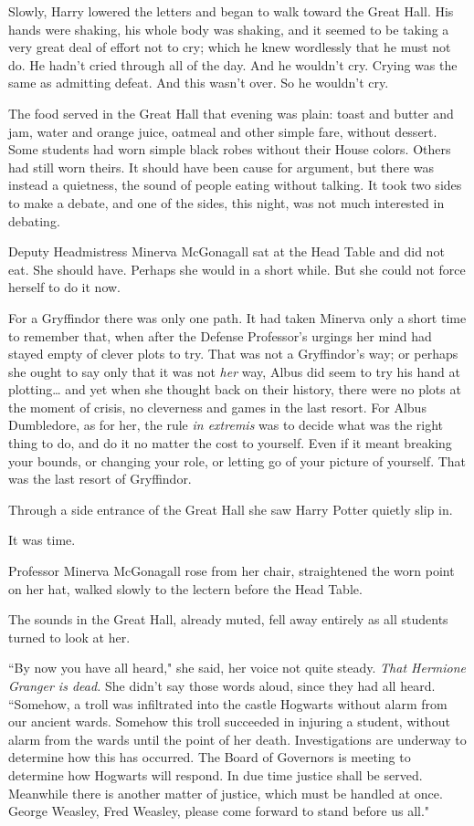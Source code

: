 Slowly, Harry lowered the letters and began to walk toward the Great Hall. His hands were shaking, his whole body was shaking, and it seemed to be taking a very great deal of effort not to cry; which he knew wordlessly that he must not do. He hadn't cried through all of the day. And he wouldn't cry. Crying was the same as admitting defeat. And this wasn't over. So he wouldn't cry.

\later

The food served in the Great Hall that evening was plain: toast and butter and jam, water and orange juice, oatmeal and other simple fare, without dessert. Some students had worn simple black robes without their House colors. Others had still worn theirs. It should have been cause for argument, but there was instead a quietness, the sound of people eating without talking. It took two sides to make a debate, and one of the sides, this night, was not much interested in debating.

Deputy Headmistress Minerva McGonagall sat at the Head Table and did not eat. She should have. Perhaps she would in a short while. But she could not force herself to do it now.

For a Gryffindor there was only one path. It had taken Minerva only a short time to remember that, when after the Defense Professor's urgings her mind had stayed empty of clever plots to try. That was not a Gryffindor's way; or perhaps she ought to say only that it was not \emph{her} way, Albus did seem to try his hand at plotting{\ldots} and yet when she thought back on their history, there were no plots at the moment of crisis, no cleverness and games in the last resort. For Albus Dumbledore, as for her, the rule \emph{in extremis} was to decide what was the right thing to do, and do it no matter the cost to yourself. Even if it meant breaking your bounds, or changing your role, or letting go of your picture of yourself. That was the last resort of Gryffindor.

Through a side entrance of the Great Hall she saw Harry Potter quietly slip in.

It was time.

Professor Minerva McGonagall rose from her chair, straightened the worn point on her hat, walked slowly to the lectern before the Head Table.

The sounds in the Great Hall, already muted, fell away entirely as all students turned to look at her.

``By now you have all heard," she said, her voice not quite steady. \emph{That Hermione Granger is dead.} She didn't say those words aloud, since they had all heard. ``Somehow, a troll was infiltrated into the castle Hogwarts without alarm from our ancient wards. Somehow this troll succeeded in injuring a student, without alarm from the wards until the point of her death. Investigations are underway to determine how this has occurred. The Board of Governors is meeting to determine how Hogwarts will respond. In due time justice shall be served. Meanwhile there is another matter of justice, which must be handled at once. George Weasley, Fred Weasley, please come forward to stand before us all."

